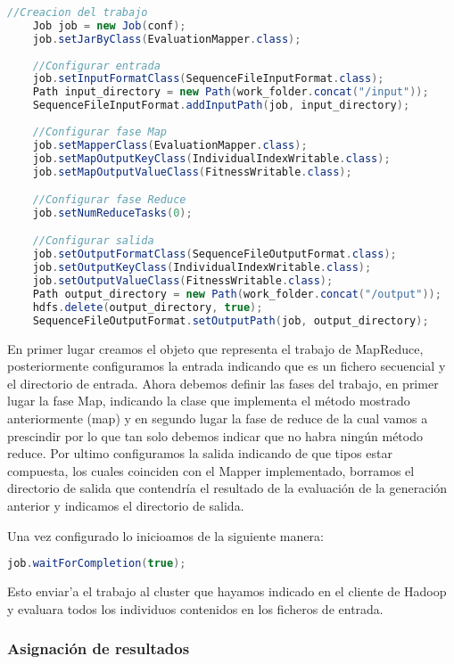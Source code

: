 \begin{lstlisting}[language=Java]
	//Creacion del trabajo
	Job job = new Job(conf);
	job.setJarByClass(EvaluationMapper.class);
	
	//Configurar entrada
	job.setInputFormatClass(SequenceFileInputFormat.class);
	Path input_directory = new Path(work_folder.concat("/input"));
	SequenceFileInputFormat.addInputPath(job, input_directory);
	
	//Configurar fase Map
	job.setMapperClass(EvaluationMapper.class);
	job.setMapOutputKeyClass(IndividualIndexWritable.class);
	job.setMapOutputValueClass(FitnessWritable.class);

	//Configurar fase Reduce
	job.setNumReduceTasks(0);

	//Configurar salida
	job.setOutputFormatClass(SequenceFileOutputFormat.class);
	job.setOutputKeyClass(IndividualIndexWritable.class);
	job.setOutputValueClass(FitnessWritable.class);
	Path output_directory = new Path(work_folder.concat("/output"));
	hdfs.delete(output_directory, true);
	SequenceFileOutputFormat.setOutputPath(job, output_directory);
\end{lstlisting}

En primer lugar creamos el objeto que representa el trabajo de MapReduce, posteriormente configuramos la entrada indicando que es un fichero secuencial y el directorio de entrada. Ahora debemos definir las fases del trabajo, en primer lugar la fase Map, indicando la clase que implementa el método mostrado anteriormente (map) y en segundo lugar la fase de reduce de la cual vamos a prescindir por lo que tan solo debemos indicar que no habra ningún método reduce. Por ultimo configuramos la salida indicando de que tipos estar compuesta, los cuales coinciden con el Mapper implementado, borramos el directorio de salida que contendría el resultado de la evaluación de la generación anterior y indicamos el directorio de salida.

Una vez configurado lo inicioamos de la siguiente manera:

\begin{lstlisting}[language=Java]
	job.waitForCompletion(true);
\end{lstlisting}

Esto enviar'a el trabajo al cluster que hayamos indicado en el cliente de Hadoop y evaluara todos los individuos contenidos en los ficheros de entrada.

\subsubsection{Asignaci\'on de resultados}

